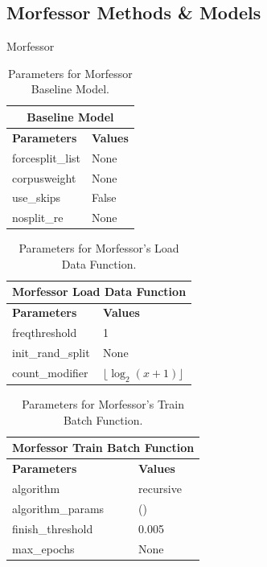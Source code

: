 \documentclass[12pt,a4paper]{article}
\numberwithin{figure}{section}
\numberwithin{table}{section}
\numberwithin{definition}{section}
\begin{document}
\subsection{Morfessor Methods \& Models}
\label{ssec:morfessorapp}

Morfessor

\begin{table}[!h]
  \centering
  \renewcommand{\arraystretch}{1.5} 
  \begin{tabular}{@{}ll@{}}
  \hline
  \multicolumn{2}{|c|}{\textbf{Baseline Model}} \\
  \hline
  \textbf{Parameters} & \textbf{Values} \\
  \hline
  forcesplit\_list & None \\
  corpusweight & None \\
  use\_skips & False \\
  nosplit\_re & None \\
  \hline
  \end{tabular}
  \caption{Parameters for Morfessor Baseline Model.}
  \label{tbl:morfessorbaselineparams}
\end{table}

\begin{table}[!h]
  \centering
  \renewcommand{\arraystretch}{1.5} 
  \begin{tabular}{@{}ll@{}}
  \hline
  \multicolumn{2}{|c|}{\textbf{Morfessor Load Data Function}} \\
  \hline
  \textbf{Parameters} & \textbf{Values} \\
  \hline
  freqthreshold & 1 \\
  init\_rand\_split & None \\
  count\_modifier & $\lfloor\log_2(x + 1)\rfloor$ \\
  \hline
  \end{tabular}
  \caption{Parameters for Morfessor's Load Data Function.}
  \label{tbl:morfessorloaddataparams}
\end{table}

\begin{table}[!h]
  \centering
  \renewcommand{\arraystretch}{1.5} 
  \begin{tabular}{@{}ll@{}}
  \hline
  \multicolumn{2}{|c|}{\textbf{Morfessor Train Batch Function}} \\
  \hline
  \textbf{Parameters} & \textbf{Values} \\
  \hline
  algorithm & recursive \\
  algorithm\_params & () \\
  finish\_threshold & 0.005 \\
  max\_epochs & None \\
  \hline
  \end{tabular}
  \caption{Parameters for Morfessor's Train Batch Function.}
  \label{tbl:morfessortrainbatchparams}
\end{table}



\end{document}
